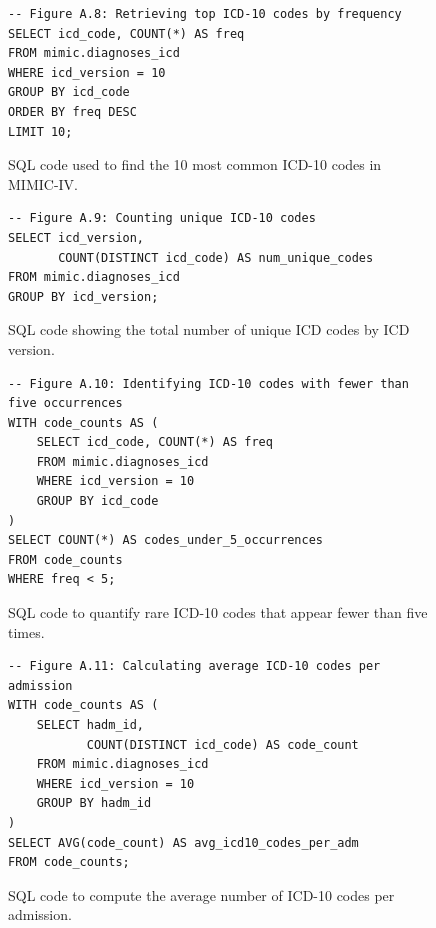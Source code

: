 \begin{figure}[H]
\centering
\begin{minipage}{\textwidth}
\begin{verbatim}
-- Figure A.8: Retrieving top ICD-10 codes by frequency
SELECT icd_code, COUNT(*) AS freq
FROM mimic.diagnoses_icd
WHERE icd_version = 10
GROUP BY icd_code
ORDER BY freq DESC
LIMIT 10;
\end{verbatim}
\end{minipage}
\caption{SQL code used to find the 10 most common ICD-10 codes in MIMIC-IV.}
\label{fig:sql8_top_icd10_codes}
\end{figure}

\begin{figure}[H]
\centering
\begin{minipage}{\textwidth}
\begin{verbatim}
-- Figure A.9: Counting unique ICD-10 codes
SELECT icd_version,
       COUNT(DISTINCT icd_code) AS num_unique_codes
FROM mimic.diagnoses_icd
GROUP BY icd_version;
\end{verbatim}
\end{minipage}
\caption{SQL code showing the total number of unique ICD codes by ICD version.}
\label{fig:sql9_unique_codes}
\end{figure}

\begin{figure}[H]
\centering
\begin{minipage}{\textwidth}
\begin{verbatim}
-- Figure A.10: Identifying ICD-10 codes with fewer than five occurrences
WITH code_counts AS (
    SELECT icd_code, COUNT(*) AS freq
    FROM mimic.diagnoses_icd
    WHERE icd_version = 10
    GROUP BY icd_code
)
SELECT COUNT(*) AS codes_under_5_occurrences
FROM code_counts
WHERE freq < 5;
\end{verbatim}
\end{minipage}
\caption{SQL code to quantify rare ICD-10 codes that appear fewer than five times.}
\label{fig:sql10_rare_codes}
\end{figure}

\begin{figure}[H]
\centering
\begin{minipage}{\textwidth}
\begin{verbatim}
-- Figure A.11: Calculating average ICD-10 codes per admission
WITH code_counts AS (
    SELECT hadm_id,
           COUNT(DISTINCT icd_code) AS code_count
    FROM mimic.diagnoses_icd
    WHERE icd_version = 10
    GROUP BY hadm_id
)
SELECT AVG(code_count) AS avg_icd10_codes_per_adm
FROM code_counts;
\end{verbatim}
\end{minipage}
\caption{SQL code to compute the average number of ICD-10 codes per admission.}
\label{fig:sql11_avg_codes_per_admission}
\end{figure}

